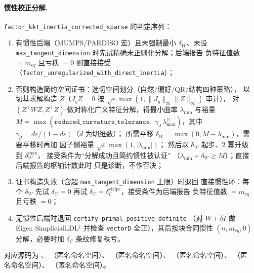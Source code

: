 \paragraph{惯性校正分解.}
\texttt{factor\_kkt\_inertia\_corrected\_sparse} 的判定序列：
\begin{enumerate}
  \item 有惯性后端（MUMPS/PARDISO 宏）且未强制最小 $\delta_W$、未设
        \texttt{max\_tangent\_dimension} 时先试精确未正则化分解；后端报告
        负特征值数 $= m_{eq}$ 且亏秩 $=0$ 则直接接受
        （\texttt{factor\_unregularized\_with\_direct\_inertia}）；
  \item 否则构造简约空间证书：选切空间划分（自然/偏好/QR/结构四种策略），
        以切基求解构造 $Z$（$J_g Z = 0$ 按
        $\sqrt{\varepsilon}\max(1, \|J_g\|_{\infty}\|Z\|_{\infty})$ 审计），
        对 $(Z^{\top} W Z, Z^{\top} Z)$ 做对称化广义特征分解，得最小曲率
        $\lambda_{\min}$ 与裕量
        $M = \max(\texttt{reduced\_curvature\_tolerance},\;
        \gamma_{d}\, \lambda_{\max}^{|\cdot|})$，其中
        $\gamma_d = d\varepsilon/(1 - d\varepsilon)$（$d$ 为切维数）；
        所需平移 $\delta_W = \max(0, M - \lambda_{\min})$，需要平移时再加
        因子侧裕量 $\sqrt{\varepsilon}\max(1, |\lambda_{\min}|)$；
        然后以 $\delta_W$ 起步、2 幂升级到 $\delta_W^{\max}$，
        接受条件为``分解成功且简约惯性被认证''
        （$\lambda_{\min} + \delta_W \ge M$）；直接后端报告的枢轴计数此时
        只是诊断，不作否决；
  \item 证书构造失败（含超 \texttt{max\_tangent\_dimension} 上限）时退回
        直接惯性环：每个 $\delta_W$ 先试 $\delta_C = 0$ 再试
        $\delta_C = \delta_C^{\text{stripe}}$，接受条件为后端报告
        负特征值数 $= m_{eq}$ 且亏秩 $=0$；
  \item 无惯性后端时退回 \texttt{certify\_primal\_positive\_definite}
        （对 $W + \delta I$ 做 Eigen SimplicialLDLᵀ 并检查 \texttt{vectorD}
        全正），其后按块合同惯性 $(n, m_{eq}, 0)$ 分解，必要时加
        $\delta_C$ 条纹修复秩亏。
\end{enumerate}
对应源码为 、
（匿名命名空间）、
（匿名命名空间）、
（匿名命名空间）、
（匿名命名空间）、
（匿名命名空间）。

